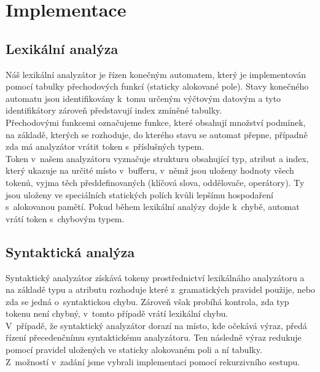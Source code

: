 \documentclass[11pt]{article}
\begin{document}
	\section{Implementace}
	
	\subsection{Lexikální analýza}
    	Náš lexikální analyzátor je řízen konečným automatem, který je implementován pomocí tabulky přechodových funkcí (staticky alokované pole). Stavy konečného automatu jsou identifikovány k~tomu určeným výčtovým datovým a tyto identifikátory zároveň představují index zmíněné tabulky. \\
    	\indent Přechodovými funkcemi označujeme funkce, které obsahují množství podmínek, na základě, kterých se rozhoduje, do kterého stavu se automat přepne, případně zda má analyzátor vrátit token s~příslušných typem. \\
     	\indent Token v~našem analyzátoru vyznačuje strukturu obsahující typ, atribut a index, který ukazuje na  určité místo v~bufferu, v~němž jsou uloženy hodnoty všech tokenů, vyjma těch předdefinovaných (klíčová slova, oddělovače, operátory). Ty jsou uloženy ve speciálních statických polích kvůli lepšímu hospodaření s~alokovanou pamětí. Pokud během lexikální analýzy dojde k~chybě, automat vrátí token s~chybovým typem. 

	\subsection{Syntaktická analýza}
	    Syntaktický analyzátor získává tokeny prostřednictví lexikálnáho analyzátoru a na základě typu a atributu rozhoduje které z~gramatických pravidel použije, nebo zda se jedná o~syntaktickou chybu. Zároveň však probíhá kontrola, zda typ tokenu není chybný, v~tomto případě vrátí lexikální chybu. \\
	    \indent V~případě, že syntaktický analyzátor dorazí na místo, kde očekává výraz, předá řízení přecedenčnímu syntaktickému analyzátoru. Ten následně výraz redukuje pomocí pravidel uložených ve staticky alokovaném poli a ní tabulky. \\
	    \indent Z~možností v~zadání jsme vybrali implementaci pomocí rekurzivního sestupu.
	
\end{document}
